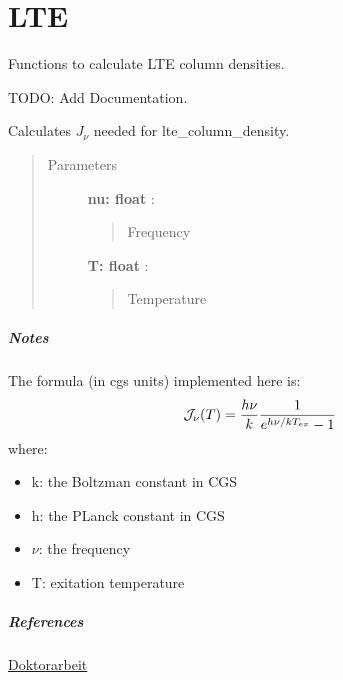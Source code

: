 \documentclass[a4paper,10pt,english]{sphinxmanual}
\begin{document}
\chapter{LTE}
\label{lte:module-astrolyze.lte.lte}\label{lte::doc}\label{lte:lte}
Functions to calculate LTE column densities.

TODO: Add Documentation.

\begin{fulllineitems}
\label{lte:astrolyze.lte.lte.calc_jnu}
Calculates $J_{\nu}$ needed for lte\_column\_density.
\begin{quote}\begin{description}
\item[{Parameters }] \leavevmode
\textbf{nu: float} :
\begin{quote}

Frequency
\end{quote}

\textbf{T: float} :
\begin{quote}

Temperature
\end{quote}

\end{description}\end{quote}
\paragraph{Notes}

The formula (in cgs units) implemented here is:
\begin{gather}
\begin{split}\mathcal{J}_{\nu}(T) = \frac{h\nu}{k} \frac{1}{e^{h\nu/kT_{ex}}-1}\end{split}\notag
\end{gather}
where:
\begin{itemize}
\item {} 
k: the Boltzman constant in CGS

\item {} 
h: the PLanck constant in CGS

\item {} 
$\nu$: the frequency

\item {} 
T: exitation temperature

\end{itemize}
\paragraph{References}

{\hyperref[lte:doktorarbeit]{Doktorarbeit}}

\end{fulllineitems}
\end{document}
